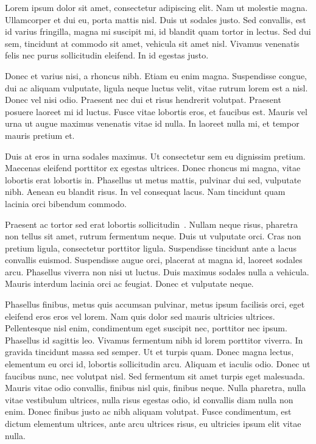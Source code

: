 
Lorem ipsum dolor sit amet, consectetur adipiscing elit. Nam ut molestie magna. Ullamcorper et dui eu, porta mattis nisl. Duis ut sodales justo. Sed convallis, est id varius fringilla, magna mi suscipit mi, id blandit quam tortor in lectus. Sed dui sem, tincidunt at commodo sit amet, vehicula sit amet nisl. Vivamus venenatis felis nec purus sollicitudin eleifend. In id egestas justo.

Donec et varius nisi, a rhoncus nibh. Etiam eu enim magna. Suspendisse congue, dui ac aliquam vulputate, ligula neque luctus velit, vitae rutrum lorem est a nisl. Donec vel nisi odio. Praesent nec dui et risus hendrerit volutpat. Praesent posuere laoreet mi id luctus. Fusce vitae lobortis eros, et faucibus est. Mauris vel urna ut augue maximus venenatis vitae id nulla. In laoreet nulla mi, et tempor mauris pretium et.

Duis at eros in urna sodales maximus. Ut consectetur sem eu dignissim pretium. Maecenas eleifend porttitor ex egestas ultrices. Donec rhoncus mi magna, vitae lobortis erat lobortis in. Phasellus ut metus mattis, pulvinar dui sed, vulputate nibh. Aenean eu blandit risus. In vel consequat lacus. Nam tincidunt quam lacinia orci bibendum commodo.

Praesent ac tortor sed erat lobortis sollicitudin~\cite{Sirota2016}. Nullam neque risus, pharetra non tellus sit amet, rutrum fermentum neque. Duis ut vulputate orci. Cras non pretium ligula, consectetur porttitor ligula. Suspendisse tincidunt ante a lacus convallis euismod. Suspendisse augue orci, placerat at magna id, laoreet sodales arcu. Phasellus viverra non nisi ut luctus. Duis maximus sodales nulla a vehicula. Mauris interdum lacinia orci ac feugiat. Donec et vulputate neque.

Phasellus finibus, metus quis accumsan pulvinar, metus ipsum facilisis orci, eget eleifend eros eros vel lorem. Nam quis dolor sed mauris ultricies ultrices. Pellentesque nisl enim, condimentum eget suscipit nec, porttitor nec ipsum. Phasellus id sagittis leo. Vivamus fermentum nibh id lorem porttitor viverra. In gravida tincidunt massa sed semper. Ut et turpis quam. Donec magna lectus, elementum eu orci id, lobortis sollicitudin arcu. Aliquam et iaculis odio. Donec ut faucibus nunc, nec volutpat nisl. Sed fermentum sit amet turpis eget malesuada. Mauris vitae odio convallis, finibus nisl quis, finibus neque. Nulla pharetra, nulla vitae vestibulum ultrices, nulla risus egestas odio, id convallis diam nulla non enim. Donec finibus justo ac nibh aliquam volutpat. Fusce condimentum, est dictum elementum ultrices, ante arcu ultrices risus, eu ultricies ipsum elit vitae nulla.

